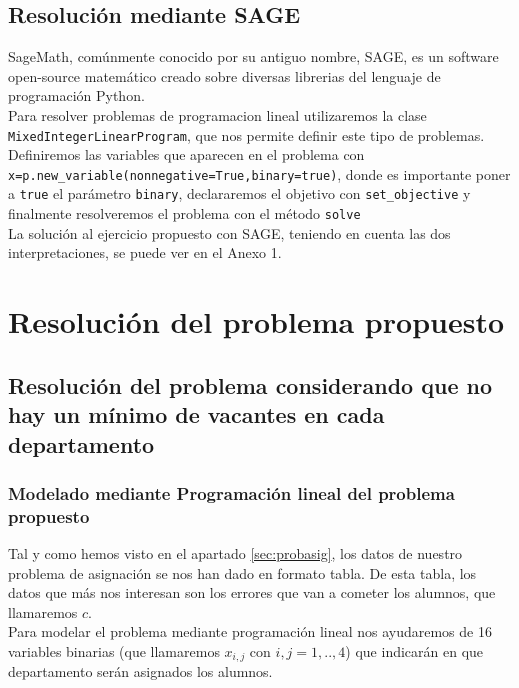 \documentclass[11pt]{article}
\begin{document}
\subsection{Resolución mediante SAGE}
SageMath\cite{sageweb}, comúnmente conocido por su antiguo nombre, SAGE, es un software open-source matemático creado sobre diversas librerias del lenguaje de programación Python\cite{pythonweb}.\\

Para resolver problemas de programacion lineal utilizaremos la clase \texttt{MixedIntegerLinearProgram}, que nos permite definir este tipo de problemas.\\
Definiremos las variables que aparecen en el problema con\\ \texttt{x=p.new\_variable(nonnegative=True,binary=true)}, donde es importante poner a \texttt{true} el parámetro \texttt{binary}, declararemos el objetivo con \texttt{set\_objective} y finalmente resolveremos el problema con el método \texttt{solve}\\
La solución al ejercicio propuesto con SAGE, teniendo en cuenta las dos interpretaciones, se puede ver en el Anexo 1.




\section{Resolución del problema propuesto}
\subsection{Resolución del problema considerando que no hay un mínimo de vacantes en cada departamento}

\subsubsection{Modelado mediante Programación lineal del problema propuesto}\label{ref:proglineal}
Tal y como hemos visto en el apartado \ref{sec:probasig}, los datos de nuestro problema de asignación se nos han dado en formato tabla. De esta tabla, los datos que más nos interesan son los errores que van a cometer los alumnos, que llamaremos $c$.\\
Para modelar el problema mediante programación lineal nos ayudaremos de 16 variables binarias (que llamaremos $x_{i,j}$ con $i,j = 1,..,4$) que indicarán en que departamento serán asignados los alumnos.\\
\end{document}
